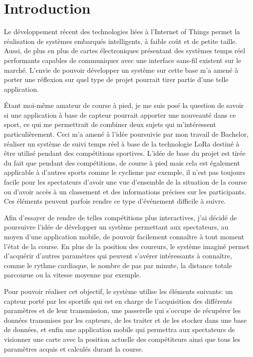 \chapter{Introduction}

Le développement récent des technologies liées à l'Internet of Things permet la réalisation de systèmes embarqués intelligents, à faible coût et de petite taille. Aussi, de plus en plus de cartes électroniques présentant des systèmes temps réel performants capables de communiquer avec une interface sans-fil existent sur le marché. L'envie de pouvoir développer un système sur cette base m'a amené à porter une réflexion sur quel type de projet pourrait tirer partie d'une telle application. 

Étant moi-même amateur de course à pied, je me suis posé la question de savoir si une application à base de capteur pourrait apporter une nouveauté dans ce sport, ce qui me permettrait de combiner deux sujets qui m'intéressent particulièrement. Ceci m'a amené à l'idée poursuivie par mon travail de Bachelor, réaliser un système de suivi temps réel à base de la technologie LoRa destiné à être utilisé pendant des compétitions sportives. L'idée de base du projet est tirée du fait que pendant des compétitions, de course à pied mais cela est également applicable à d'autres sports comme le cyclisme par exemple, il n'est pas toujours facile pour les spectateurs d'avoir une vue d'ensemble de la situation de la course ou d’avoir accès à un classement et des informations précises sur les participants. Ces éléments peuvent parfois rendre ce type d'événement difficile à suivre.

Afin d'essayer de rendre de telles compétitions plus interactives, j'ai décidé de poursuivre l'idée de développer un système permettant aux spectateurs, au moyen d'une application mobile, de pouvoir facilement connaître à tout moment l'état de la course. En plus de la position des coureurs, le système imaginé permet d'acquérir d'autres paramètres qui peuvent s'avérer intéressants à connaître, comme le rythme cardiaque, le nombre de pas par minute, la distance totale parcourue ou la vitesse moyenne par exemple.

Pour pouvoir réaliser cet objectif, le système utilise les éléments suivants: un capteur porté par les sportifs qui est en charge de l'acquisition des différents paramètres et de leur transmission, une passerelle qui s'occupe de récupérer les données transmises par les capteurs, de les traiter et de les stocker dans une base de données, et enfin une application mobile qui permettra aux spectateurs de visionner une carte avec la position actuelle des compétiteurs ainsi que tous les paramètres acquis et calculés durant la course.

